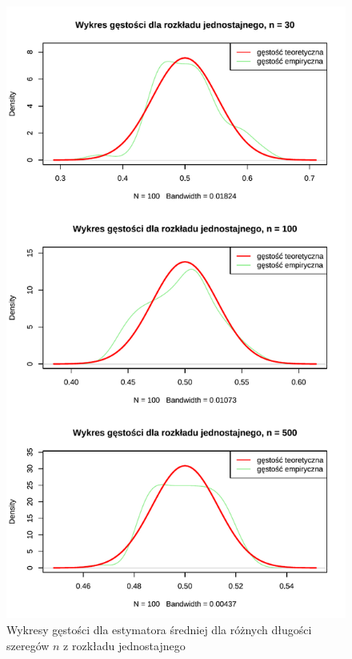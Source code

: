 \documentclass[10pt, a4paper]{article}\usepackage[]{graphicx}\usepackage[]{xcolor}
\makeatletter
\def\maxwidth{ %
  \ifdim\Gin@nat@width>\linewidth
    \linewidth
  \else
    \Gin@nat@width
  \fi
}
\newenvironment{knitrout}{}{} %
\makeatother
\begin{document}
\begin{knitrout}
\color{fgcolor}\begin{figure}[H]

{\centering \includegraphics[width=\maxwidth]{figure/analiza-sredniej-unif-dens-1} 

}

\caption[Wykresy gęstości dla estymatora średniej dla różnych długości szeregów $n$ z rozkładu jednostajnego]{Wykresy gęstości dla estymatora średniej dla różnych długości szeregów $n$ z rozkładu jednostajnego}\label{fig:analiza-sredniej-unif-dens}
\end{figure}

\end{knitrout}
\end{document}
